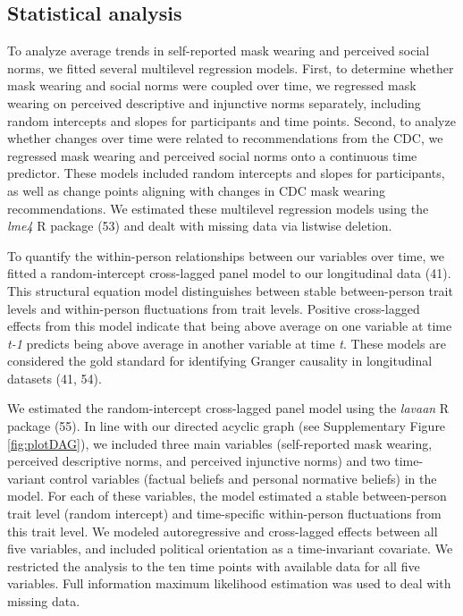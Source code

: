 \documentclass[
  man, donotrepeattitle,floatsintext]{apa6}
\begin{document}
\hypertarget{statistical-analysis}{%
\subsection{Statistical analysis}\label{statistical-analysis}}

To analyze average trends in self-reported mask wearing and perceived social norms, we fitted several multilevel regression models. First, to determine whether mask wearing and social norms were coupled over time, we regressed mask wearing on perceived descriptive and injunctive norms separately, including random intercepts and slopes for participants and time points. Second, to analyze whether changes over time were related to recommendations from the CDC, we regressed mask wearing and perceived social norms onto a continuous time predictor. These models included random intercepts and slopes for participants, as well as change points aligning with changes in CDC mask wearing recommendations. We estimated these multilevel regression models using the \emph{lme4} R package (53) and dealt with missing data via listwise deletion.

To quantify the within-person relationships between our variables over time, we fitted a random-intercept cross-lagged panel model to our longitudinal data (41). This structural equation model distinguishes between stable between-person trait levels and within-person fluctuations from trait levels. Positive cross-lagged effects from this model indicate that being above average on one variable at time \emph{t-1} predicts being above average in another variable at time \emph{t}. These models are considered the gold standard for identifying Granger causality in longitudinal datasets (41, 54).

We estimated the random-intercept cross-lagged panel model using the \emph{lavaan} R package (55). In line with our directed acyclic graph (see Supplementary Figure \ref{fig:plotDAG}), we included three main variables (self-reported mask wearing, perceived descriptive norms, and perceived injunctive norms) and two time-variant control variables (factual beliefs and personal normative beliefs) in the model. For each of these variables, the model estimated a stable between-person trait level (random intercept) and time-specific within-person fluctuations from this trait level. We modeled autoregressive and cross-lagged effects between all five variables, and included political orientation as a time-invariant covariate. We restricted the analysis to the ten time points with available data for all five variables. Full information maximum likelihood estimation was used to deal with missing data.
\end{document}
